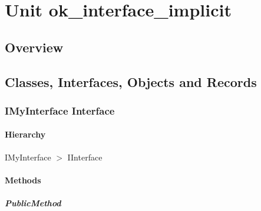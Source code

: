 \documentclass{report}
\begin{document}
\newlength{\tmplength}
\chapter{Unit ok{\_}interface{\_}implicit}
\section{Overview}
\begin{description}
\item[\texttt{\begin{ttfamily}IMyInterface\end{ttfamily} Interface}]
\item[\texttt{\begin{ttfamily}TMyRecord\end{ttfamily} Record}]
\item[\texttt{\begin{ttfamily}TMyPackedRecord\end{ttfamily} Packed Record}]
\item[\texttt{\begin{ttfamily}TMyClass\end{ttfamily} Class}]
\end{description}
\section{Classes, Interfaces, Objects and Records}
\subsection*{IMyInterface Interface}
\subsubsection*{\large{\textbf{Hierarchy}}\normalsize\hspace{1ex}\hfill}
IMyInterface {$>$} IInterface
\subsubsection*{\large{\textbf{Methods}}\normalsize\hspace{1ex}\hfill}
\paragraph*{PublicMethod}\hspace*{\fill}
\end{document}
